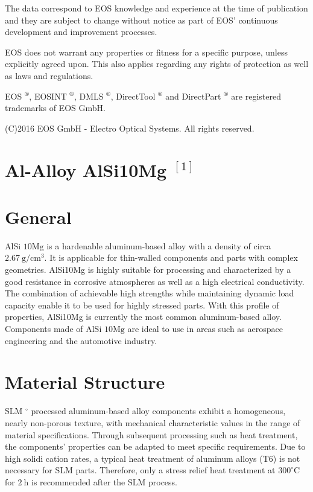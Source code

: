 \documentclass[10pt]{article}
\begin{document}
The data correspond to EOS knowledge and experience at the time of publication and they are subject to change without notice as part of EOS' continuous development and improvement processes.

EOS does not warrant any properties or fitness for a specific purpose, unless explicitly agreed upon. This also applies regarding any rights of protection as well as laws and regulations.

EOS ${ }^{\circledR}$, EOSINT ${ }^{\circledR}$, DMLS ${ }^{\circledR}$, DirectTool ${ }^{\circledR}$ and DirectPart ${ }^{\circledR}$ are registered trademarks of EOS GmbH.

(C)2016 EOS GmbH - Electro Optical Systems. All rights reserved.

\section*{Al-Alloy AlSi10Mg ${ }^{[1]}$}
\section*{General}
AlSi $10 \mathrm{Mg}$ is a hardenable aluminum-based alloy with a density of circa $2.67 \mathrm{~g} / \mathrm{cm}^{3}$. It is applicable for thin-walled components and parts with complex geometries. AlSi10Mg is highly suitable for processing and characterized by a good resistance in corrosive atmospheres as well as a high electrical conductivity. The combination of achievable high strengths while maintaining dynamic load capacity enable it to be used for highly stressed parts. With this profile of properties, AlSi10Mg is currently the most common aluminum-based alloy. Components made of AlSi $10 \mathrm{Mg}$ are ideal to use in areas such as aerospace engineering and the automotive industry.

\section*{Material Structure}
SLM $^{\circ}$ processed aluminum-based alloy components exhibit a homogeneous, nearly non-porous texture, with mechanical characteristic values in the range of material specifications. Through subsequent processing such as heat treatment, the components' properties can be adapted to meet specific requirements. Due to high solidi cation rates, a typical heat treatment of aluminum alloys (T6) is not necessary for SLM parts. Therefore, only a stress relief heat treatment at $300^{\circ} \mathrm{C}$ for $2 \mathrm{~h}$ is recommended after the SLM process.
\end{document}
